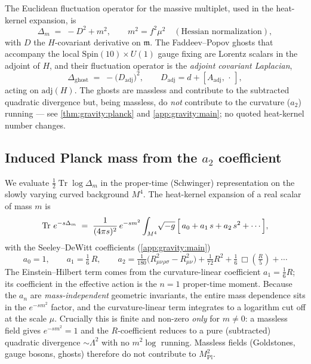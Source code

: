 \documentclass[11pt]{article}
\theoremstyle{plain}
\theoremstyle{definition}
\theoremstyle{remark}
\newcommand{\Tr}{\operatorname{Tr}}
\begin{document}
The Euclidean fluctuation operator for the massive multiplet, used in the
heat-kernel expansion, is
\begin{equation}\label{eq:gravity:Deltam}
  \Delta_{m} \;=\; -D^{2} + m^{2}, \qquad m^{2}=f^{2}\mu^{2}
  \quad(\text{Hessian normalization}),
\end{equation}
with $D$ the $H$-covariant derivative on $\mathfrak m$. The Faddeev--Popov
ghosts that accompany the local $\mathrm{Spin}(10)\times U(1)$ gauge fixing
are Lorentz scalars in the adjoint of $H$, and their fluctuation operator is
the \emph{adjoint covariant Laplacian},
\begin{equation}\label{eq:gravity:ghost}
  \Delta_{\mathrm{ghost}} \;=\; -\bigl(D_{\mathrm{adj}}\bigr)^{2},
  \qquad
  D_{\mathrm{adj}} = d + [A_{\mathrm{adj}},\,\cdot\,] ,
\end{equation}
acting on $\mathrm{adj}(H)$. The ghosts are massless and contribute to the
subtracted quadratic divergence but, being massless, do \emph{not}
contribute to the curvature ($a_{2}$) running --- see
\autoref{thm:gravity:planck} and \autoref{app:gravity:main}; no quoted
heat-kernel number changes.

\subsection{Induced Planck mass from the $a_{2}$ coefficient}
\label{sec:gravity:planck}

We evaluate $\tfrac12\Tr\log\Delta_{m}$ in the proper-time (Schwinger)
representation on the slowly varying curved background $M^{4}$. The
heat-kernel expansion of a real scalar of mass $m$ is
\begin{equation}\label{eq:gravity:hk}
  \Tr\, e^{-s\Delta_{m}}
  \;=\;
  \frac{1}{(4\pi s)^{2}}\, e^{-s m^{2}}
  \int_{M^{4}}\!\sqrt{-g}\,
  \Bigl[\,a_{0} + a_{1}\,s + a_{2}\,s^{2} + \cdots\,\Bigr],
\end{equation}
with the Seeley--DeWitt coefficients (\autoref{app:gravity:main})
\begin{equation}\label{eq:gravity:a2}
  a_{0} = 1, \qquad
  a_{1} = \tfrac{1}{6}\,R, \qquad
  a_{2} = \tfrac{1}{180}\bigl(R_{\mu\nu\rho\sigma}^{2} - R_{\mu\nu}^{2}\bigr)
        + \tfrac{1}{72}R^{2} + \tfrac{1}{6}\,\Box\!\left(\tfrac{R}{5}\right)+\cdots
\end{equation}
The Einstein--Hilbert term comes from the curvature-linear coefficient
$a_{1}=\tfrac16 R$; its coefficient in the effective action is the
$n=1$ proper-time moment. Because the $a_{n}$ are
\emph{mass-independent} geometric invariants, the entire mass dependence
sits in the $e^{-sm^{2}}$ factor, and the curvature-linear term integrates
to a logarithm cut off at the scale $\mu$. Crucially this is finite and
non-zero \emph{only} for $m\neq 0$: a massless field gives $e^{-s m^{2}}=1$
and the $R$-coefficient reduces to a pure (subtracted) quadratic divergence
$\sim\Lambda^{2}$ with no $m^{2}\log$ running. Massless fields (Goldstones,
gauge bosons, ghosts) therefore do not contribute to $M_{\mathrm{Pl}}^{2}$.
\end{document}
